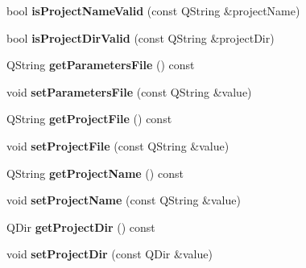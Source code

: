 \begin{DoxyCompactItemize}
\item 
bool {\bfseries is\+Project\+Name\+Valid} (const Q\+String \&project\+Name)\hypertarget{class_app_settings_a355deef5b25d7c2566c28d0ebd207c59}{}\label{class_app_settings_a355deef5b25d7c2566c28d0ebd207c59}

\item 
bool {\bfseries is\+Project\+Dir\+Valid} (const Q\+String \&project\+Dir)\hypertarget{class_app_settings_add426453dd17778054607c3142f6e1ac}{}\label{class_app_settings_add426453dd17778054607c3142f6e1ac}

\item 
Q\+String {\bfseries get\+Parameters\+File} () const \hypertarget{class_app_settings_af45425b522c929f2e0d990e9e7a0d9d2}{}\label{class_app_settings_af45425b522c929f2e0d990e9e7a0d9d2}

\item 
void {\bfseries set\+Parameters\+File} (const Q\+String \&value)\hypertarget{class_app_settings_a4ec3658ec7294c3fc446c1bcf2009c61}{}\label{class_app_settings_a4ec3658ec7294c3fc446c1bcf2009c61}

\item 
Q\+String {\bfseries get\+Project\+File} () const \hypertarget{class_app_settings_a349b8265c0ae2a6e5af2929c1b8ec7d5}{}\label{class_app_settings_a349b8265c0ae2a6e5af2929c1b8ec7d5}

\item 
void {\bfseries set\+Project\+File} (const Q\+String \&value)\hypertarget{class_app_settings_a9298dfd433440013467cf47bbf4c36dd}{}\label{class_app_settings_a9298dfd433440013467cf47bbf4c36dd}

\item 
Q\+String {\bfseries get\+Project\+Name} () const \hypertarget{class_app_settings_a533578586b655779b8f7a6d29375b081}{}\label{class_app_settings_a533578586b655779b8f7a6d29375b081}

\item 
void {\bfseries set\+Project\+Name} (const Q\+String \&value)\hypertarget{class_app_settings_ab1567f9a05f3d4a2a800d24d6ae3249e}{}\label{class_app_settings_ab1567f9a05f3d4a2a800d24d6ae3249e}

\item 
Q\+Dir {\bfseries get\+Project\+Dir} () const \hypertarget{class_app_settings_a6e2539bd6bdd0ec38b007e3cff8e891d}{}\label{class_app_settings_a6e2539bd6bdd0ec38b007e3cff8e891d}

\item 
void {\bfseries set\+Project\+Dir} (const Q\+Dir \&value)\hypertarget{class_app_settings_a8f385a5894b950b9687b2f6c551b4eb2}{}\label{class_app_settings_a8f385a5894b950b9687b2f6c551b4eb2}


\end{DoxyCompactItemize}
